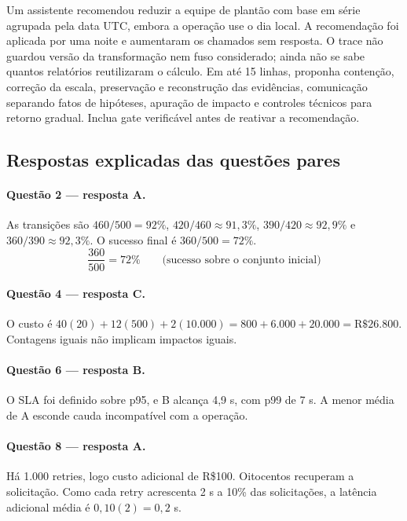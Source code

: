 \TextoBase
Um assistente recomendou reduzir a equipe de plantão com base em série agrupada pela data UTC, embora a operação use o dia local. A recomendação foi aplicada por uma noite e aumentaram os chamados sem resposta. O trace não guardou versão da transformação nem fuso considerado; ainda não se sabe quantos relatórios reutilizaram o cálculo.
\FonteDidatica
\Comando Em até 15 linhas, proponha contenção, correção da escala, preservação e reconstrução das evidências, comunicação separando fatos de hipóteses, apuração de impacto e controles técnicos para retorno gradual. Inclua gate verificável antes de reativar a recomendação.

\newpage
\subsection{Respostas explicadas das questões pares}

\paragraph{Questão 2 — resposta A.} As transições são $460/500=92\%$, $420/460\approx91{,}3\%$, $390/420\approx92{,}9\%$ e $360/390\approx92{,}3\%$. O sucesso final é $360/500=72\%$.
\[\frac{360}{500}=72\%\qquad\text{(sucesso sobre o conjunto inicial)}\]

\paragraph{Questão 4 — resposta C.} O custo é $40(20)+12(500)+2(10.000)=800+6.000+20.000=\mathrm{R\$}26.800$. Contagens iguais não implicam impactos iguais.

\paragraph{Questão 6 — resposta B.} O SLA foi definido sobre p95, e B alcança 4,9 s, com p99 de 7 s. A menor média de A esconde cauda incompatível com a operação.

\paragraph{Questão 8 — resposta A.} Há 1.000 retries, logo custo adicional de R\$100. Oitocentos recuperam a solicitação. Como cada retry acrescenta 2 s a 10\% das solicitações, a latência adicional média é $0{,}10(2)=0{,}2$ s.

